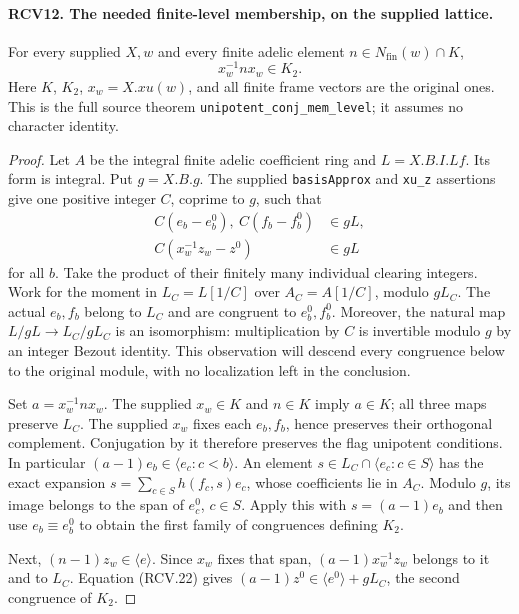 \documentclass[11pt,a4paper]{article}
\numberwithin{equation}{section}
\theoremstyle{remark}\newtheorem{remark}[theorem]{Remark}
\begin{document}

\paragraph{RCV12. The needed finite-level membership, on the supplied lattice.}
\label{claim:RCV12}
For every supplied \(X,w\) and every finite adelic element
\(n\in N_{\mathrm{fin}}(w)\cap K\),
\[
                         x_w^{-1}nx_w\in K_2.
\tag{RCV.21}
\]
Here \(K\), \(K_2\), \(x_w=X.xu(w)\), and all finite frame
vectors are the original ones.  This is the full source theorem
\texttt{unipotent\_\allowbreak conj\_\allowbreak mem\_\allowbreak level}; it assumes no character
identity.
\begin{proof}
Let \(A\) be the integral finite adelic coefficient ring and
\(L=X.B.I.Lf\).  Its form is integral.  Put \(g=X.B.g\).
The supplied \texttt{basis\allowbreak Approx} and \texttt{xu\_\allowbreak z} assertions
give one positive integer \(C\), coprime to \(g\), such that
\[
 \begin{split}
 C(e_b-e_b^0),\ C(f_b-f_b^0)&\in gL,\\
 C(x_w^{-1}z_w-z^0)&\in gL
 \end{split}
\tag{RCV.22}
\]
for all \(b\).  Take the product of their finitely many individual
clearing integers.  Work for the moment in \(L_C=L[1/C]\) over
\(A_C=A[1/C]\), modulo \(gL_C\).  The actual \(e_b,f_b\)
belong to \(L_C\) and are congruent to \(e_b^0,f_b^0\).
Moreover, the natural map \(L/gL\to L_C/gL_C\) is an
isomorphism: multiplication by \(C\) is invertible modulo \(g\)
by an integer Bezout identity.  This observation will descend every
congruence below to the original module, with no localization left
in the conclusion.

Set \(a=x_w^{-1}nx_w\).  The supplied \(x_w\in K\) and
\(n\in K\) imply \(a\in K\); all three maps preserve \(L_C\).
The supplied \(x_w\) fixes each \(e_b,f_b\), hence preserves
their orthogonal complement.  Conjugation by it therefore preserves
the flag unipotent conditions.  In particular
\((a-1)e_b\in\langle e_c:c<b\rangle\).
An element \(s\in L_C\cap\langle e_c:c\in S\rangle\)
has the exact expansion
\(s=\sum_{c\in S}h(f_c,s)e_c\), whose coefficients lie in
\(A_C\).  Modulo \(g\), its image belongs to the span of
\(e_c^0\), \(c\in S\).  Apply this with
\(s=(a-1)e_b\) and then use \(e_b\equiv e_b^0\) to obtain
the first family of congruences defining \(K_2\).

Next, \((n-1)z_w\in\langle e\rangle\).  Since \(x_w\)
fixes that span, \((a-1)x_w^{-1}z_w\) belongs to it and to
\(L_C\).  Equation (RCV.22) gives
\((a-1)z^0\in\langle e^0\rangle+gL_C\), the second
congruence of \(K_2\).


\end{proof}
\end{document}
